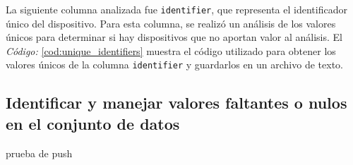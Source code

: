 \noindent La siguiente columna analizada fue \texttt{identifier}, que representa el identificador único del dispositivo. Para esta columna, se realizó un análisis de los valores únicos para determinar si hay dispositivos que no aportan valor al análisis. El \textit{Código:} \ref{cod:unique_identifiers} muestra el código utilizado para obtener los valores únicos de la columna \texttt{identifier} y guardarlos en un archivo de texto.


\subsection{Identificar y manejar valores faltantes o nulos en el conjunto de datos}

prueba de push
